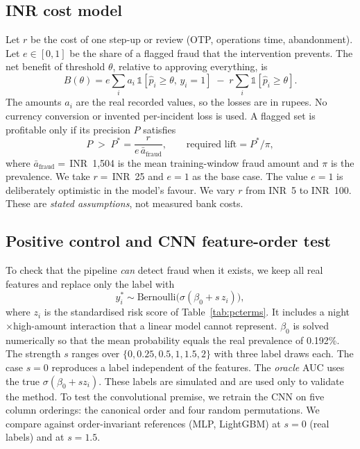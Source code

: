 \documentclass[conference]{IEEEtran}
\newcommand{\inr}{INR~}
\begin{document}
\subsection{INR cost model}\label{sec:cost}
Let $r$ be the cost of one step-up or review (OTP, operations time, abandonment). Let $e\in[0,1]$ be the share of a flagged fraud that the intervention prevents. The net benefit of threshold $\theta$, relative to approving everything, is
\begin{equation}
B(\theta) = e \sum_{i} a_i\,\mathbb{1}[\hat p_i\ge\theta,\,y_i=1] \;-\; r \sum_i \mathbb{1}[\hat p_i\ge\theta].
\end{equation}
The amounts $a_i$ are the real recorded values, so the losses are in rupees. No currency conversion or invented per-incident loss is used. A flagged set is profitable only if its precision $P$ satisfies
\begin{equation}
P \;>\; P^{*} = \frac{r}{e\,\bar a_{\text{fraud}}}, \qquad \text{required lift} = P^{*}/\pi,
\end{equation}
where $\bar a_{\text{fraud}}=$\,\inr1,504 is the mean training-window fraud amount and $\pi$ is the prevalence. We take $r=$\,\inr25 and $e=1$ as the base case. The value $e=1$ is deliberately optimistic in the model's favour. We vary $r$ from \inr5 to \inr100. These are \emph{stated assumptions}, not measured bank costs.

\subsection{Positive control and CNN feature-order test}\label{sec:pcmethod}
To check that the pipeline \emph{can} detect fraud when it exists, we keep all real features and replace only the label with
\begin{equation}
y_i^{*}\sim\text{Bernoulli}\big(\sigma(\beta_0 + s\,z_i)\big),
\end{equation}
where $z_i$ is the standardised risk score of Table~\ref{tab:pcterms}. It includes a night$\times$high-amount interaction that a linear model cannot represent. $\beta_0$ is solved numerically so that the mean probability equals the real prevalence of 0.192\%. The strength $s$ ranges over $\{0,0.25,0.5,1,1.5,2\}$ with three label draws each. The case $s=0$ reproduces a label independent of the features. The \emph{oracle} AUC uses the true $\sigma(\beta_0+s z_i)$. These labels are simulated and are used only to validate the method. To test the convolutional premise, we retrain the CNN on five column orderings: the canonical order and four random permutations. We compare against order-invariant references (MLP, LightGBM) at $s=0$ (real labels) and at $s=1.5$.
\end{document}
